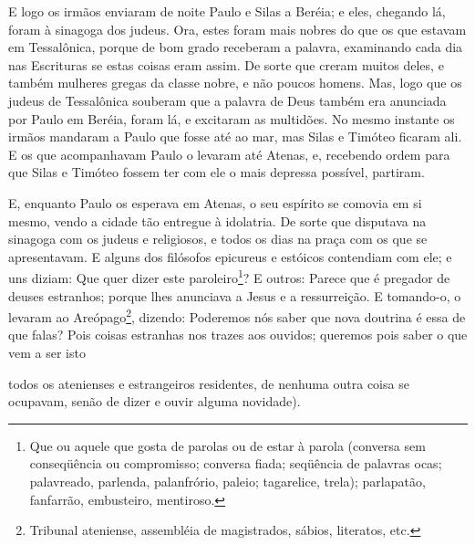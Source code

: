 E logo os irmãos enviaram de noite Paulo e Silas a Beréia; e
eles, chegando lá, foram à sinagoga dos judeus. Ora, estes
foram mais nobres do que os que estavam em Tessalônica, porque de
bom grado receberam a palavra, examinando cada dia nas Escrituras se
estas coisas eram assim. De sorte que creram muitos deles, e
também mulheres gregas da classe nobre, e não poucos homens.
Mas, logo que os judeus de Tessalônica souberam que a palavra
de Deus também era anunciada por Paulo em Beréia, foram lá, e
excitaram as multidões. No mesmo instante os irmãos mandaram
a Paulo que fosse até ao mar, mas Silas e Timóteo ficaram ali.
E os que acompanhavam Paulo o levaram até Atenas, e,
recebendo ordem para que Silas e Timóteo fossem ter com ele o mais
depressa possível, partiram.

E, enquanto Paulo os esperava em Atenas, o seu espírito se
comovia em si mesmo, vendo a cidade tão entregue à idolatria.
De sorte que disputava na sinagoga com os judeus e
religiosos, e todos os dias na praça com os que se apresentavam.
E alguns dos filósofos epicureus e estóicos contendiam com
ele; e uns diziam: Que quer dizer este paroleiro\footnote{Que ou
aquele que gosta de parolas ou de estar à parola (conversa sem
conseqüência ou compromisso; conversa fiada; seqüência de palavras
ocas; palavreado, parlenda, palanfrório, paleio; tagarelice, trela);
parlapatão, fanfarrão, embusteiro, mentiroso.}? E outros: Parece que
é pregador de deuses estranhos; porque lhes anunciava a Jesus e a
ressurreição. E tomando-o, o levaram ao
Areópago\footnote{Tribunal ateniense, assembléia de magistrados,
sábios, literatos, etc.}, dizendo: Poderemos nós saber que nova
doutrina é essa de que falas? Pois coisas estranhas nos
trazes aos ouvidos; queremos pois saber o que vem a ser isto

todos os atenienses e estrangeiros residentes, de nenhuma
outra coisa se ocupavam, senão de dizer e ouvir alguma novidade).


